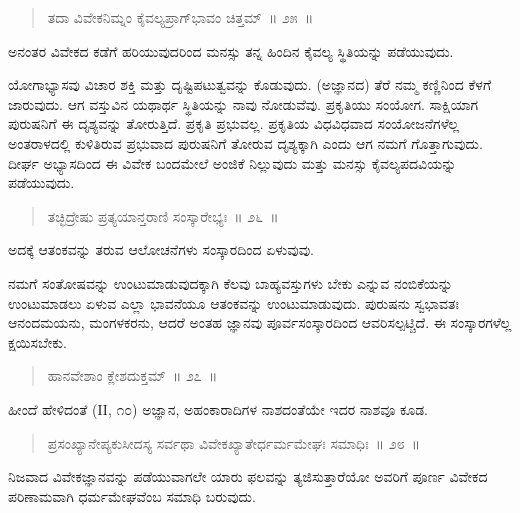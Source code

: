 \begin{verse}
ತದಾ ವಿವೇಕನಿಮ್ನಂ ಕೈವಲ್ಯಪ್ರಾಗ್​ಭಾವಂ ಚಿತ್ತಮ್​~॥ ೨೫~॥
\end{verse}

\vspace{-0.3cm}

ಅನಂತರ ವಿವೇಕದ ಕಡೆಗೆ ಹರಿಯುವುದರಿಂದ ಮನಸ್ಸು ತನ್ನ ಹಿಂದಿನ ಕೈವಲ್ಯ ಸ್ಥಿತಿಯನ್ನು ಪಡೆಯುವುದು. 

ಯೋಗಾಭ್ಯಾಸವು ವಿಚಾರ ಶಕ್ತಿ ಮತ್ತು ದೃಷ್ಟಿಪಟುತ್ವವನ್ನು ಕೊಡುವುದು. (ಅಜ್ಞಾನದ) ತೆರೆ ನಮ್ಮ ಕಣ್ಣಿನಿಂದ ಕೆಳಗೆ ಜಾರುವುದು. ಆಗ ವಸ್ತುವಿನ ಯಥಾರ್ಥ ಸ್ಥಿತಿಯನ್ನು ನಾವು ನೋಡುವೆವು. ಪ್ರಕೃತಿಯು ಸಂಯೋಗ. ಸಾಕ್ಷಿಯಾಗ ಪುರುಷನಿಗೆ ಈ ದೃಶ್ಯವನ್ನು ತೋರುತ್ತಿದೆ. ಪ್ರಕೃತಿ ಪ್ರಭುವಲ್ಲ. ಪ್ರಕೃತಿಯ ವಿಧವಿಧವಾದ ಸಂಯೋಜನೆಗಳೆಲ್ಲ ಅಂತರಾಳದಲ್ಲಿ ಕುಳಿತಿರುವ ಪ್ರಭುವಾದ ಪುರುಷನಿಗೆ ತೋರುವ ದೃಶ್ಯಕ್ಕಾಗಿ ಎಂದು ಆಗ ನಮಗೆ ಗೊತ್ತಾಗುವುದು. ದೀರ್ಘ ಅಭ್ಯಾಸದಿಂದ ಈ ವಿವೇಕ ಬಂದಮೇಲೆ ಅಂಜಿಕೆ ನಿಲ್ಲುವುದು ಮತ್ತು ಮನಸ್ಸು ಕೈವಲ್ಯಪದವಿಯನ್ನು ಪಡೆಯುವುದು. 

\vspace{-0.3cm}

\begin{verse}
ತಚ್ಛಿದ್ರೇಷು ಪ್ರತ್ಯಯಾನ್ತರಾಣಿ ಸಂಸ್ಕಾರೇಭ್ಯಃ~॥ ೨೬~॥
\end{verse}

\vspace{-0.3cm}

ಅದಕ್ಕೆ ಆತಂಕವನ್ನು ತರುವ ಆಲೋಚನೆಗಳು ಸಂಸ್ಕಾರದಿಂದ ಏಳುವುವು. 

ನಮಗೆ ಸಂತೋಷವನ್ನು ಉಂಟುಮಾಡುವುದಕ್ಕಾಗಿ ಕೆಲವು ಬಾಹ್ಯವಸ್ತುಗಳು ಬೇಕು ಎನ್ನುವ ನಂಬಿಕೆಯನ್ನು ಉಂಟುಮಾಡಲು ಏಳುವ ಎಲ್ಲಾ ಭಾವನೆಯೂ ಆತಂಕವನ್ನು ಉಂಟುಮಾಡುವುದು. ಪುರುಷನು ಸ್ವಭಾವತಃ ಆನಂದಮಯನು, ಮಂಗಳಕರನು, ಆದರೆ ಅಂತಹ ಜ್ಞಾನವು ಪೂರ್ವಸಂಸ್ಕಾರದಿಂದ ಆವರಿಸಲ್ಪಟ್ಚಿದೆ. ಈ ಸಂಸ್ಕಾರಗಳೆಲ್ಲ ಕ್ಷಯಿಸಬೇಕು. 

\vspace{-0.3cm}

\begin{verse}
ಹಾನವೇಶಾಂ ಕ್ಲೇಶದುಕ್ತಮ್​~॥ ೨೭~॥
\end{verse}

\vspace{-0.3cm}

ಹೀಂದೆ ಹೇಳಿದಂತೆ (II, ೧೦) ಅಜ್ಞಾನ, ಅಹಂಕಾರಾದಿಗಳ ನಾಶದಂತೆಯೇ ಇದರ ನಾಶವೂ ಕೂಡ. 

\vspace{-0.3cm}

\begin{verse}
ಪ್ರಸಂಖ್ಯಾನೇಪ್ಯಕುಸೀದಸ್ಯ ಸರ್ವಥಾ ವಿವೇಕಖ್ಯಾತೇರ್ಧರ್ಮಮೇಘಃ ಸಮಾಧಿಃ~॥ ೨೮~॥
\end{verse}

\vspace{-0.3cm}

ನಿಜವಾದ ವಿವೇಕಜ್ಞಾನವನ್ನು ಪಡೆಯುವಾಗಲೇ ಯಾರು ಫಲವನ್ನು ತ್ಯಜಿಸುತ್ತಾರೆಯೋ ಅವರಿಗೆ ಪೂರ್ಣ ವಿವೇಕದ ಪರಿಣಾಮವಾಗಿ ಧರ್ಮಮೇಘವೆಂಬ ಸಮಾಧಿ ಬರುವುದು. 

